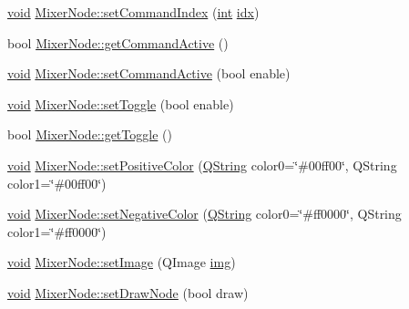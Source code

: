 \begin{DoxyCompactItemize}
\item 
\hyperlink{group___u_a_v_objects_plugin_ga444cf2ff3f0ecbe028adce838d373f5c}{void} \hyperlink{group___u_a_v_object_widget_utils_ga85c1946a33e5309ac2b9aa3675671935}{Mixer\-Node\-::set\-Command\-Index} (\hyperlink{ioapi_8h_a787fa3cf048117ba7123753c1e74fcd6}{int} \hyperlink{uavobjecttemplate_8m_a49654e4709f40aecccada266daa32fc6}{idx})
\item 
bool \hyperlink{group___u_a_v_object_widget_utils_ga63b0822569ce8326323c15159682c57e}{Mixer\-Node\-::get\-Command\-Active} ()
\item 
\hyperlink{group___u_a_v_objects_plugin_ga444cf2ff3f0ecbe028adce838d373f5c}{void} \hyperlink{group___u_a_v_object_widget_utils_ga224ddcb050b9008c2352ca9c1318159d}{Mixer\-Node\-::set\-Command\-Active} (bool enable)
\item 
\hyperlink{group___u_a_v_objects_plugin_ga444cf2ff3f0ecbe028adce838d373f5c}{void} \hyperlink{group___u_a_v_object_widget_utils_ga55f38aaacbac71e094d96baf3df429a4}{Mixer\-Node\-::set\-Toggle} (bool enable)
\item 
bool \hyperlink{group___u_a_v_object_widget_utils_gab63ea3448c47f2e65a056ec49b30e0d1}{Mixer\-Node\-::get\-Toggle} ()
\item 
\hyperlink{group___u_a_v_objects_plugin_ga444cf2ff3f0ecbe028adce838d373f5c}{void} \hyperlink{group___u_a_v_object_widget_utils_ga1318ec003e5b6d72bb03b061f6df3996}{Mixer\-Node\-::set\-Positive\-Color} (\hyperlink{group___u_a_v_objects_plugin_gab9d252f49c333c94a72f97ce3105a32d}{Q\-String} color0=\char`\"{}\#00ff00\char`\"{}, Q\-String color1=\char`\"{}\#00ff00\char`\"{})
\item 
\hyperlink{group___u_a_v_objects_plugin_ga444cf2ff3f0ecbe028adce838d373f5c}{void} \hyperlink{group___u_a_v_object_widget_utils_gaa22c8cab4fa7424caf1a9168f12365e3}{Mixer\-Node\-::set\-Negative\-Color} (\hyperlink{group___u_a_v_objects_plugin_gab9d252f49c333c94a72f97ce3105a32d}{Q\-String} color0=\char`\"{}\#ff0000\char`\"{}, Q\-String color1=\char`\"{}\#ff0000\char`\"{})
\item 
\hyperlink{group___u_a_v_objects_plugin_ga444cf2ff3f0ecbe028adce838d373f5c}{void} \hyperlink{group___u_a_v_object_widget_utils_ga85ed2c5bf8ae66f16496bd5fef25362b}{Mixer\-Node\-::set\-Image} (Q\-Image \hyperlink{glext_8h_a27b0ff5636e690ca10d0abb150a9e9ed}{img})
\item 
\hyperlink{group___u_a_v_objects_plugin_ga444cf2ff3f0ecbe028adce838d373f5c}{void} \hyperlink{group___u_a_v_object_widget_utils_ga90b5c3c03fb1cca75ba471125d93b550}{Mixer\-Node\-::set\-Draw\-Node} (bool draw)

\end{DoxyCompactItemize}

